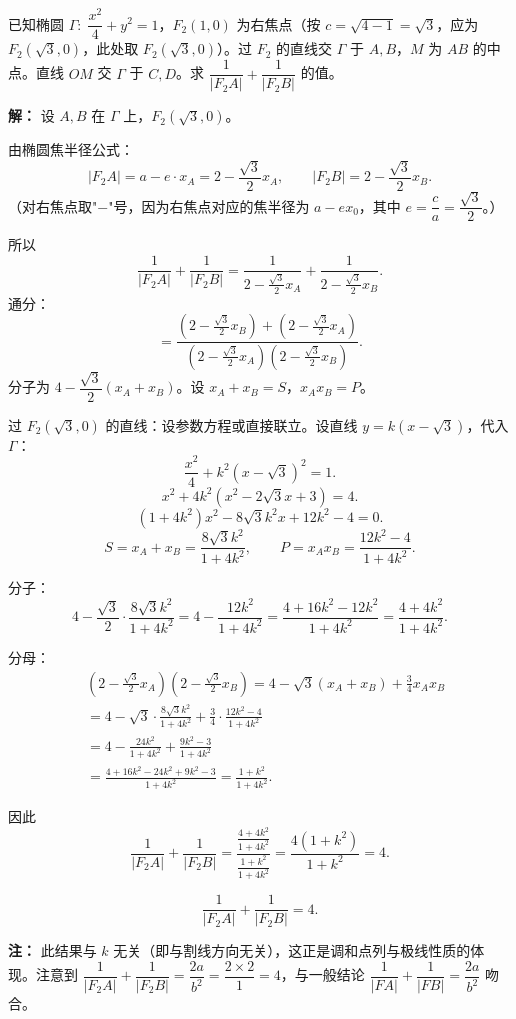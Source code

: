 \documentclass[12pt,a4paper]{ctexart}
\theoremstyle{definition}
\begin{document}
\begin{examplebox}
已知椭圆 $\Gamma:\;\dfrac{x^2}{4}+y^2=1$，$F_2(1,0)$ 为右焦点（按 $c=\sqrt{4-1}=\sqrt{3}$，应为 $F_2(\sqrt{3},0)$，此处取 $F_2(\sqrt{3},0)$）。过 $F_2$ 的直线交 $\Gamma$ 于 $A,B$，$M$ 为 $AB$ 的中点。直线 $OM$ 交 $\Gamma$ 于 $C,D$。求 $\dfrac{1}{|F_2A|}+\dfrac{1}{|F_2B|}$ 的值。
\end{examplebox}

\begin{solutionbox}
\textbf{解：}
设 $A,B$ 在 $\Gamma$ 上，$F_2(\sqrt{3},0)$。

由椭圆焦半径公式：
\[
  |F_2A|=a-e\cdot x_A=2-\frac{\sqrt{3}}{2}x_A,\qquad |F_2B|=2-\frac{\sqrt{3}}{2}x_B.
\]
（对右焦点取"$-$"号，因为右焦点对应的焦半径为 $a-ex_0$，其中 $e=\dfrac{c}{a}=\dfrac{\sqrt{3}}{2}$。）

所以
\[
  \frac{1}{|F_2A|}+\frac{1}{|F_2B|}
  =\frac{1}{2-\frac{\sqrt{3}}{2}x_A}+\frac{1}{2-\frac{\sqrt{3}}{2}x_B}.
\]
通分：
\[
  =\frac{(2-\frac{\sqrt{3}}{2}x_B)+(2-\frac{\sqrt{3}}{2}x_A)}{(2-\frac{\sqrt{3}}{2}x_A)(2-\frac{\sqrt{3}}{2}x_B)}.
\]
分子为 $4-\dfrac{\sqrt{3}}{2}(x_A+x_B)$。设 $x_A+x_B=S$，$x_A x_B=P$。

过 $F_2(\sqrt{3},0)$ 的直线：设参数方程或直接联立。设直线 $y=k(x-\sqrt{3})$，代入 $\Gamma$：
\[
  \frac{x^2}{4}+k^2(x-\sqrt{3})^2=1.
\]
\[
  x^2+4k^2(x^2-2\sqrt{3}x+3)=4.
\]
\[
  (1+4k^2)x^2-8\sqrt{3}k^2 x+12k^2-4=0.
\]
\[
  S=x_A+x_B=\frac{8\sqrt{3}k^2}{1+4k^2},\qquad P=x_A x_B=\frac{12k^2-4}{1+4k^2}.
\]

分子：
\[
  4-\frac{\sqrt{3}}{2}\cdot\frac{8\sqrt{3}k^2}{1+4k^2}=4-\frac{12k^2}{1+4k^2}=\frac{4+16k^2-12k^2}{1+4k^2}=\frac{4+4k^2}{1+4k^2}.
\]

分母：
\begin{align*}
  &(2-\tfrac{\sqrt{3}}{2}x_A)(2-\tfrac{\sqrt{3}}{2}x_B)=4-\sqrt{3}(x_A+x_B)+\tfrac{3}{4}x_A x_B\\
  &=4-\sqrt{3}\cdot\frac{8\sqrt{3}k^2}{1+4k^2}+\frac{3}{4}\cdot\frac{12k^2-4}{1+4k^2}\\
  &=4-\frac{24k^2}{1+4k^2}+\frac{9k^2-3}{1+4k^2}\\
  &=\frac{4+16k^2-24k^2+9k^2-3}{1+4k^2}=\frac{1+k^2}{1+4k^2}.
\end{align*}

因此
\[
  \frac{1}{|F_2A|}+\frac{1}{|F_2B|}=\frac{\frac{4+4k^2}{1+4k^2}}{\frac{1+k^2}{1+4k^2}}=\frac{4(1+k^2)}{1+k^2}=4.
\]

\[
  \boxed{\frac{1}{|F_2A|}+\frac{1}{|F_2B|}=4.}
\]

\textbf{注：} 此结果与 $k$ 无关（即与割线方向无关），这正是调和点列与极线性质的体现。注意到 $\dfrac{1}{|F_2A|}+\dfrac{1}{|F_2B|}=\dfrac{2a}{b^2}=\dfrac{2\times2}{1}=4$，与一般结论 $\dfrac{1}{|FA|}+\dfrac{1}{|FB|}=\dfrac{2a}{b^2}$ 吻合。
\end{solutionbox}
\end{document}
